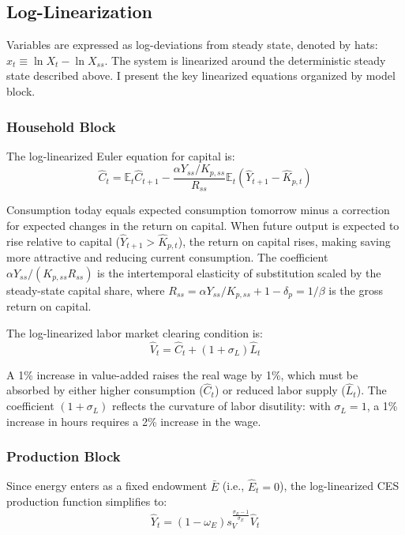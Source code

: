 \documentclass[12pt, a4paper]{article}
\begin{document}
\subsection{Log-Linearization}

Variables are expressed as log-deviations from steady state, denoted by hats: $\hat{x}_t \equiv \ln X_t - \ln X_{ss}$. The system is linearized around the deterministic steady state described above. I present the key linearized equations organized by model block.

\subsubsection{Household Block}

The log-linearized Euler equation for capital is:
\begin{equation}
\hat{C}_t = \mathbb{E}_t \hat{C}_{t+1} - \frac{\alpha Y_{ss}/K_{p,ss}}{R_{ss}} \mathbb{E}_t \left(\hat{Y}_{t+1} - \hat{K}_{p,t}\right)
\label{eq:euler_lin}
\end{equation}

Consumption today equals expected consumption tomorrow minus a correction for expected changes in the return on capital. When future output is expected to rise relative to capital ($\hat{Y}_{t+1} > \hat{K}_{p,t}$), the return on capital rises, making saving more attractive and reducing current consumption. The coefficient $\alpha Y_{ss}/(K_{p,ss} R_{ss})$ is the intertemporal elasticity of substitution scaled by the steady-state capital share, where $R_{ss} = \alpha Y_{ss}/K_{p,ss} + 1 - \delta_p = 1/\beta$ is the gross return on capital.

The log-linearized labor market clearing condition is:
\begin{equation}
\hat{V}_t = \hat{C}_t + (1+\sigma_L)\hat{L}_t
\label{eq:labor_lin}
\end{equation}

A 1\% increase in value-added raises the real wage by 1\%, which must be absorbed by either higher consumption ($\hat{C}_t$) or reduced labor supply ($\hat{L}_t$). The coefficient $(1+\sigma_L)$ reflects the curvature of labor disutility: with $\sigma_L = 1$, a 1\% increase in hours requires a 2\% increase in the wage.

\subsubsection{Production Block}

Since energy enters as a fixed endowment $\bar{E}$ (i.e., $\hat{E}_t = 0$), the log-linearized CES production function simplifies to:
\begin{equation}
\hat{Y}_t = (1-\omega_E) s_V^{\frac{\sigma_E - 1}{\sigma_E}} \hat{V}_t
\label{eq:output_lin}
\end{equation}
\end{document}
